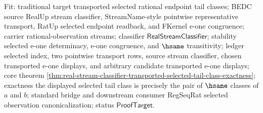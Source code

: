 Fit: traditional target transported selected rational endpoint tail classes;
BEDC source RealUp stream classifier, StreamName-style pointwise representative
transport, RatUp selected endpoint readback, and FKernel e-one congruence;
carrier rational-observation streams; classifier
$\mathsf{RealStreamClassifier}$; stability selected e-one determinacy, e-one
congruence, and $\hsame$ transitivity; ledger selected index, two pointwise
transport rows, source stream classifier, chosen transported e-one displays,
and arbitrary candidate transported e-one displays; core theorem
\autoref{thm:real-stream-classifier-transported-selected-tail-class-exactness};
exactness the displayed selected tail class is precisely the pair of
$\hsame$ classes of $a$ and $b$; standard bridge and downstream consumer
RegSeqRat selected observation canonicalization; status
$\mathsf{ProofTarget}$.

